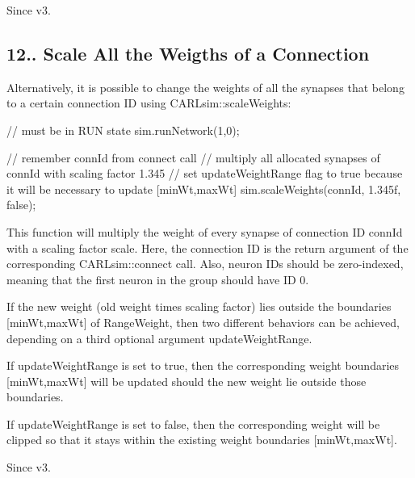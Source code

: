 \begin{DoxySince}{Since}
v3.
\end{DoxySince}
\hypertarget{ch12_advanced_topics_ch12s4s4_scale_weights}{}\subsection{12.. Scale All the Weigths of a Connection}\label{ch12_advanced_topics_ch12s4s4_scale_weights}
Alternatively, it is possible to change the weights of all the synapses that belong to a certain connection ID using C\+A\+R\+Lsim\+::scale\+Weights\+: 
\begin{DoxyCode}
\textcolor{comment}{// must be in RUN state}
sim.runNetwork(1,0);

\textcolor{comment}{// remember connId from connect call}
\textcolor{comment}{// multiply all allocated synapses of connId with scaling factor 1.345}
\textcolor{comment}{// set updateWeightRange flag to true because it will be necessary to update [minWt,maxWt]}
sim.scaleWeights(connId, 1.345f, \textcolor{keyword}{false});
\end{DoxyCode}
 This function will multiply the weight of every synapse of connection ID {\ttfamily conn\+Id} with a scaling factor {\ttfamily scale}. Here, the connection ID is the return argument of the corresponding C\+A\+R\+Lsim\+::connect call. Also, neuron I\+Ds should be zero-\/indexed, meaning that the first neuron in the group should have ID 0.

If the new weight (old weight times scaling factor) lies outside the boundaries {\ttfamily \mbox{[}min\+Wt,max\+Wt\mbox{]}} of Range\+Weight, then two different behaviors can be achieved, depending on a third optional argument {\ttfamily update\+Weight\+Range}.
\begin{DoxyItemize}
\item If {\ttfamily update\+Weight\+Range} is set to {\ttfamily true}, then the corresponding weight boundaries {\ttfamily \mbox{[}min\+Wt,max\+Wt\mbox{]}} will be updated should the new weight lie outside those boundaries.
\item If {\ttfamily update\+Weight\+Range} is set to {\ttfamily false}, then the corresponding weight will be clipped so that it stays within the existing weight boundaries {\ttfamily \mbox{[}min\+Wt,max\+Wt\mbox{]}}.
\end{DoxyItemize}

\begin{DoxySince}{Since}
v3. 
\end{DoxySince}
